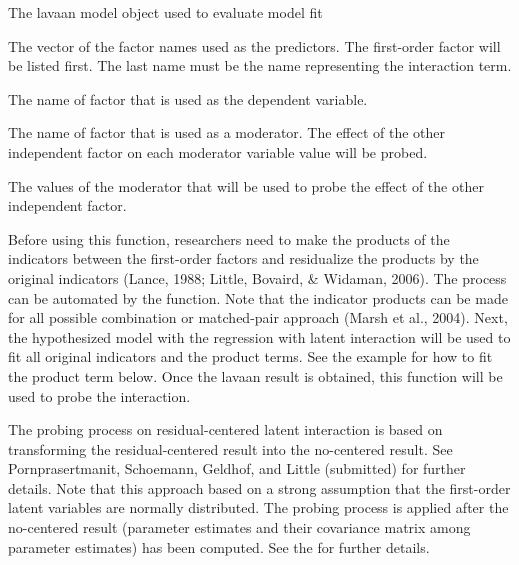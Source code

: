 \documentclass[a4paper]{book}
\begin{document}
%
\begin{Arguments}
\begin{ldescription}
\item[\code{fit}] The lavaan model object used to evaluate model fit
\item[\code{nameX}] The vector of the factor names used as the predictors. The first-order factor will be listed first. The last name must be the name representing the interaction term.
\item[\code{nameY}] The name of factor that is used as the dependent variable.
\item[\code{modVar}] The name of factor that is used as a moderator. The effect of the other independent factor on each moderator variable value will be probed.
\item[\code{valProbe}] The values of the moderator that will be used to probe the effect of the other independent factor.
\end{ldescription}
\end{Arguments}
%
\begin{Details}\relax
Before using this function, researchers need to make the products of the indicators between the first-order factors and residualize the products by the original indicators (Lance, 1988; Little, Bovaird, \& Widaman, 2006). The process can be automated by the  function. Note that the indicator products can be made for all possible combination or matched-pair approach (Marsh et al., 2004). Next, the hypothesized model with the regression with latent interaction will be used to fit all original indicators and the product terms. See the example for how to fit the product term below. Once the lavaan result is obtained, this function will be used to probe the interaction.

The probing process on residual-centered latent interaction is based on transforming the residual-centered result into the no-centered result. See Pornprasertmanit, Schoemann, Geldhof, and Little (submitted) for further details. Note that this approach based on a strong assumption that the first-order latent variables are normally distributed. The probing process is applied after the no-centered result (parameter estimates and their covariance matrix among parameter estimates) has been computed. See the  for further details.
\end{Details}
%
\end{document}
